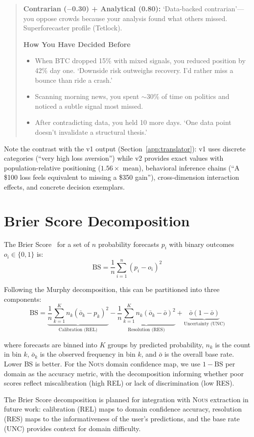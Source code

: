 \documentclass[11pt]{article}
\newcommand{\nous}{\textsc{Nous}}
\begin{document}
\begin{quote}
\textbf{Contrarian ($-$0.30) + Analytical (0.80):} `Data-backed contrarian'---you oppose crowds because your analysis found what others missed. Superforecaster profile (Tetlock).

\textbf{How You Have Decided Before}
\begin{itemize}[leftmargin=*,itemsep=1pt]
\item When BTC dropped 15\% with mixed signals, you reduced position by 42\% day one. `Downside risk outweighs recovery. I'd rather miss a bounce than ride a crash.'
\item Scanning morning news, you spent $\sim$30\% of time on politics and noticed a subtle signal most missed.
\item After contradicting data, you held 10 more days. `One data point doesn't invalidate a structural thesis.'
\end{itemize}
\end{quote}

Note the contrast with the v1 output (Section~\ref{app:translator}): v1 uses discrete categories (``very high loss aversion'') while v2 provides exact values with population-relative positioning ($1.56\times$ mean), behavioral inference chains (``A \$100 loss feels equivalent to missing a \$350 gain''), cross-dimension interaction effects, and concrete decision exemplars.


\section{Brier Score Decomposition}
\label{app:brier}

The Brier Score~\citep{brier1950verification} for a set of $n$ probability forecasts $p_i$ with binary outcomes $o_i \in \{0, 1\}$ is:
\begin{equation}
    \text{BS} = \frac{1}{n} \sum_{i=1}^{n} (p_i - o_i)^2
\end{equation}

Following the Murphy decomposition, this can be partitioned into three components:
\begin{equation}
    \text{BS} = \underbrace{\frac{1}{n} \sum_{k=1}^{K} n_k (\bar{o}_k - p_k)^2}_{\text{Calibration (REL)}} - \underbrace{\frac{1}{n} \sum_{k=1}^{K} n_k (\bar{o}_k - \bar{o})^2}_{\text{Resolution (RES)}} + \underbrace{\bar{o}(1 - \bar{o})}_{\text{Uncertainty (UNC)}}
\end{equation}

where forecasts are binned into $K$ groups by predicted probability, $n_k$ is the count in bin $k$, $\bar{o}_k$ is the observed frequency in bin $k$, and $\bar{o}$ is the overall base rate. Lower BS is better. For the \nous{} domain confidence map, we use $1 - \text{BS}$ per domain as the accuracy metric, with the decomposition informing whether poor scores reflect miscalibration (high REL) or lack of discrimination (low RES).

The Brier Score decomposition is planned for integration with \nous{} extraction in future work: calibration (REL) maps to domain confidence accuracy, resolution (RES) maps to the informativeness of the user's predictions, and the base rate (UNC) provides context for domain difficulty.
\end{document}

